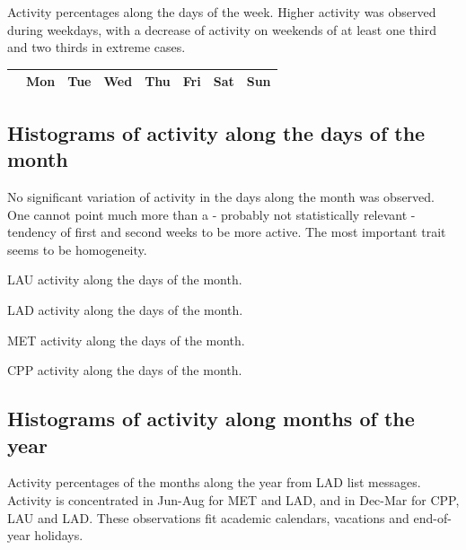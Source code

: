 \documentclass[%
 aip,
 jmp,%
 amsmath,amssymb,
 reprint,%
 floatfix,
]{revtex4-1}
\begin{document}
Activity percentages along the days of the week. Higher activity was observed during weekdays, with a decrease of activity on weekends of at least one third and two thirds in extreme cases.

\begin{table}[!h]
\begin{center}
    \begin{tabular}{ | l |  c | c | c | c | c |   c | c |}
        \hline
        & Mon & Tue & Wed & Thu & Fri & Sat & Sun  \\ \hline
	
    \end{tabular}
\end{center}
\label{tab:win}
\end{table}

\FloatBarrier
\subsection{Histograms of activity along the days of the month}
	No significant variation of activity in the days along the month was observed. One cannot point much more than a - probably not statistically relevant - tendency of first and second weeks to be more active. The most important trait seems to be homogeneity.
\begin{table}[!h]
	\caption{LAU activity along the days of the month.}
	\footnotesize
	
\label{tab:min}
\end{table}
\begin{table}[!h]
	\caption{LAD activity along the days of the month.}
	\footnotesize
	
\label{tab:min}
\end{table}
\begin{table}[!h]
	\caption{MET activity along the days of the month.}
	\footnotesize
	
\label{tab:min}
\end{table}
\begin{table}[!h]
	\caption{CPP activity along the days of the month.}
	\footnotesize
	
\label{tab:min}
\end{table}

\FloatBarrier
\subsection{Histograms of activity along months of the year}
	Activity percentages of the months along the year from LAD list messages. Activity is concentrated in Jun-Aug for MET and LAD, and in Dec-Mar for CPP, LAU and LAD. These observations fit academic calendars, vacations and end-of-year holidays.
\end{document}
